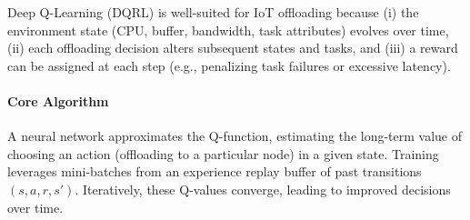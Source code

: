 \label{subsec:dqrl}

Deep Q-Learning (DQRL) is well-suited for IoT offloading because (i) the environment state (CPU, buffer, bandwidth, task attributes) evolves over time, (ii) each offloading decision alters subsequent states and tasks, and (iii) a reward can be assigned at each step (e.g., penalizing task failures or excessive latency).

\paragraph{Core Algorithm}
A neural network approximates the Q-function, estimating the long-term value of choosing an action (offloading to a particular node) in a given state. Training leverages mini-batches from an experience replay buffer of past transitions \((s,a,r,s')\). Iteratively, these Q-values converge, leading to improved decisions over time.

